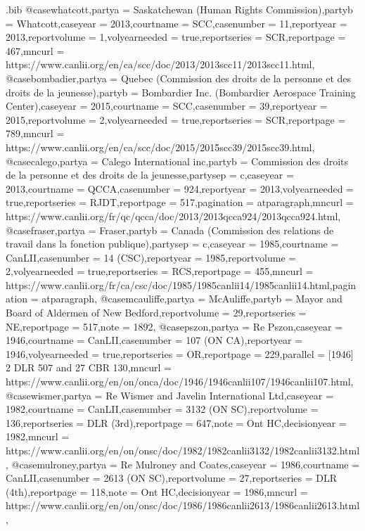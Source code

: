 \begin{filecontents*}[overwrite]{\jobname.bib}
@case{whatcott,partya = {Saskatchewan (Human Rights Commission)},partyb = {Whatcott},caseyear = {2013},courtname = {SCC},casenumber = {11},reportyear = {2013},reportvolume = {1},volyearneeded = {true},reportseries = {SCR},reportpage = {467},mncurl = {https://www.canlii.org/en/ca/scc/doc/2013/2013scc11/2013scc11.html},}
@case{bombadier,partya = {Quebec (Commission des droits de la personne et des droits de la jeunesse)},partyb = {Bombardier Inc. (Bombardier Aerospace Training Center)},caseyear = {2015},courtname = {SCC},casenumber = {39},reportyear = {2015},reportvolume = {2},volyearneeded = {true},reportseries = {SCR},reportpage = {789},mncurl = {https://www.canlii.org/en/ca/scc/doc/2015/2015scc39/2015scc39.html},}
@case{calego,partya = {Calego International inc},partyb = {Commission des droits de la personne et des droits de la jeunesse},partysep = {c},caseyear = {2013},courtname = {QCCA},casenumber = {924},reportyear = {2013},volyearneeded = {true},reportseries = {RJDT},reportpage = {517},pagination = {atparagraph},mncurl = {https://www.canlii.org/fr/qc/qcca/doc/2013/2013qcca924/2013qcca924.html},}
@case{fraser,partya = {Fraser},partyb = {Canada (Commission des relations de travail dans la fonction publique)},partysep = {c},caseyear = {1985},courtname = {CanLII},casenumber = {14 (CSC)},reportyear = {1985},reportvolume = {2},volyearneeded = {true},reportseries = {RCS},reportpage = {455},mncurl = {https://www.canlii.org/fr/ca/csc/doc/1985/1985canlii14/1985canlii14.html},pagination = {atparagraph},}
@case{mcauliffe,partya = {McAuliffe},partyb = {Mayor and Board of Aldermen of New Bedford},reportvolume = {29},reportseries = {NE},reportpage = {517},note = {1892},}
@case{pszon,partya = {Re Pszon},caseyear = {1946},courtname = {CanLII},casenumber = {107 (ON CA)},reportyear = {1946},volyearneeded = {true},reportseries = {OR},reportpage = {229},parallel = {[1946] 2 DLR 507 and 27 CBR 130},mncurl = {https://www.canlii.org/en/on/onca/doc/1946/1946canlii107/1946canlii107.html},}
@case{wismer,partya = {Re Wismer and Javelin International Ltd},caseyear = {1982},courtname = {CanLII},casenumber = {3132 (ON SC)},reportvolume = {136},reportseries = {DLR (3rd)},reportpage = {647},note = {Ont HC},decisionyear = {1982},mncurl = {https://www.canlii.org/en/on/onsc/doc/1982/1982canlii3132/1982canlii3132.html},}
@case{mulroney,partya = {Re Mulroney and Coates},caseyear = {1986},courtname = {CanLII},casenumber = {2613 (ON SC)},reportvolume = {27},reportseries = {DLR (4th)},reportpage = {118},note = {Ont HC},decisionyear = {1986},mncurl = {https://www.canlii.org/en/on/onsc/doc/1986/1986canlii2613/1986canlii2613.html},}

\end{filecontents*}
